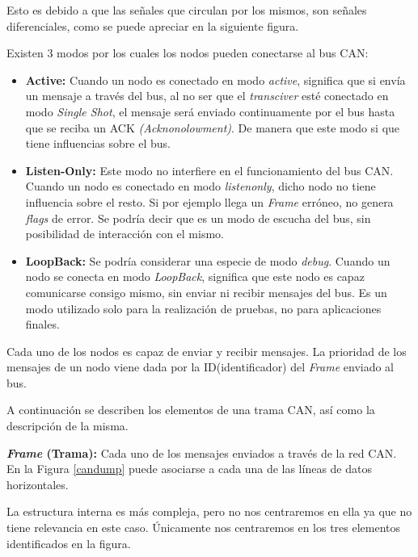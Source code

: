 Esto es debido a que las señales que circulan por los mismos, son señales diferenciales, como se puede apreciar en la siguiente figura.


Existen 3 modos por los cuales los nodos pueden conectarse al bus CAN:

\begin{itemize}
\item
\textbf{Active:} Cuando un nodo es conectado en modo \emph{active}, significa que si envía un mensaje a través del bus, al no ser que el \emph{transciver} esté conectado en modo \emph{Single Shot}, el mensaje será enviado continuamente por el bus hasta que se reciba un ACK \emph{(Acknonolowment)}. De manera que este modo si que tiene influencias sobre el bus.

\item
\textbf{Listen-Only:} Este modo no interfiere en el funcionamiento del bus CAN. Cuando un nodo es conectado en modo \emph{listenonly}, dicho nodo no tiene influencia sobre el resto. Si por ejemplo llega un \emph{Frame} erróneo, no genera \emph{flags} de error. Se podría decir que es un modo de escucha del bus, sin posibilidad de interacción con el mismo.

\item
\textbf{LoopBack:} Se podría considerar una especie de modo \emph{debug}. Cuando un nodo se conecta en modo \emph{LoopBack}, significa que este nodo es capaz comunicarse consigo mismo, sin enviar ni recibir mensajes del bus. Es un modo utilizado solo para la realización de pruebas, no para aplicaciones finales.

\end{itemize}

Cada uno de los nodos es capaz de enviar y recibir mensajes. La prioridad de los mensajes de un nodo viene dada por la ID(identificador) del \emph{Frame} enviado al bus.


A continuación se describen los elementos de una trama CAN, así como la descripción de la misma.

\textbf{\emph{Frame} (Trama):} Cada uno de los mensajes enviados a través de la red CAN. En la Figura \ref{candump} puede asociarse a cada una de las líneas de datos horizontales.

La estructura interna es más compleja, pero no nos centraremos en ella ya que no tiene relevancia en este caso. Únicamente nos centraremos en los tres elementos identificados en la figura.

